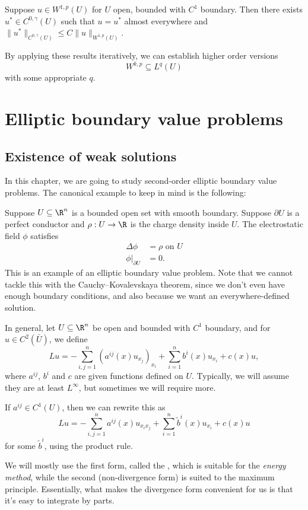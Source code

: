\documentclass[a4paper]{article}
\begin{document}
\begin{cor}
  Suppose $u \in W^{1, p}(U)$ for $U$ open, bounded with $C^1$ boundary. Then there exists $u^* \in C^{0, \gamma}(U)$ such that $u = u^*$ almost everywhere and $\|u^*\|_{C^{0, \gamma}(U)} \leq C\|u\|_{W^{1, p}(U)}$.
\end{cor}

By applying these results iteratively, we can establish higher order versions
\[
  W^{k, p} \subseteq L^q(U)
\]
with some appropriate $q$.

\section{Elliptic boundary value problems}
\subsection{Existence of weak solutions}
In this chapter, we are going to study second-order elliptic boundary value problems. The canonical example to keep in mind is the following:
\begin{eg}
  Suppose $U \subseteq \R^n$ is a bounded open set with smooth boundary. Suppose $\partial U$ is a perfect conductor and $\rho: U \to \R$ is the charge density inside $U$. The electrostatic field $\phi$ satisfies
  \begin{align*}
    \Delta \phi &= \rho\text{ on }U\\
    \phi |_{\partial U} &= 0.
  \end{align*}
  This is an example of an elliptic boundary value problem. Note that we cannot tackle this with the Cauchy--Kovalevskaya theorem, since we don't even have enough boundary conditions, and also because we want an everywhere-defined solution.
\end{eg}

In general, let $U \subseteq \R^n$ be open and bounded with $C^1$ boundary, and for $u \in C^2(\bar{U})$, we define
\[
  Lu = - \sum_{i, j = 1}^n (a^{ij}(x) u_{x_j})_{x_i} + \sum_{i = 1}^n b^i(x) u_{x_i} + c(x) u,
\]
where $a^{ij}$, $b^i$ and $c$ are given functions defined on $U$. Typically, we will assume they are at least $L^\infty$, but sometimes we will require more.

If $a^{ij} \in C^1(U)$, then we can rewrite this as
\[
  Lu = - \sum_{i, j = 1}^n a^{ij}(x) u_{x_i x_j} + \sum_{i = 1}^n \tilde{b}^i(x) u_{x_i} + c(x) u
\]
for some $\tilde{b}^i$, using the product rule.

We will mostly use the first form, called the , which is suitable for the \emph{energy method}, while the second (non-divergence form) is suited to the maximum principle. Essentially, what makes the divergence form convenient for us is that it's easy to integrate by parts.
\end{document}
